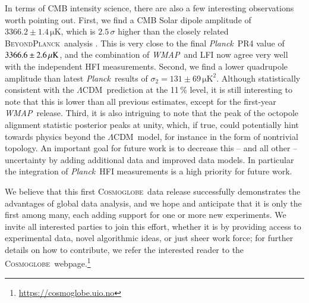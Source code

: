 \documentclass[twocolumn]{../../common/aa}
\def\WMAP{\emph{WMAP}}
\def\COBE{\emph{COBE}}
\def\Planck{\emph{Planck}}
\def\LCDM{$\Lambda$CDM}
\newcommand{\bp}{\textsc{BeyondPlanck}}
\newcommand{\cosmoglobe}{\textsc{Cosmoglobe}}
\begin{document}
In terms of CMB intensity science, there are also a few interesting observations worth pointing out. First, we find a CMB Solar dipole amplitude of $3366.2\pm1.4\,\mathrm{\mu K}$, which is $2.5\,\sigma$ higher than the closely related \bp\ analysis \citep{bp11}. This is very close to the final \Planck\ PR4 value of $3366.6\pm2.6\muK$, and the combination of \WMAP\ and LFI now agree very well with the independent HFI measurements. Second, we find a lower quadrupole amplitude than latest \Planck\ results of $\sigma_2 = 131 \pm 69\,\mathrm{\mu K^2}$. Although statistically consistent with the \LCDM\ prediction at the 11\,\% level, it is still interesting to note that this is lower than all previous estimates, except for the first-year \WMAP\ release. Third, it is also intriguing to note that the peak of the octopole alignment statistic posterior peaks at unity, which, if true, could potentially hint towards physics beyond the \LCDM\ model, for instance in the form of nontrivial topology. An important goal for future work is to decrease this -- and all other -- uncertainty by adding additional data and improved data models. In particular the integration of \Planck\ HFI measurements is a high priority for future work.

We believe that this first \cosmoglobe\ data release successfully demonstrates the advantages of global data analysis, and we hope and anticipate that it is only the first among many, each adding support for one or more new experiments. We invite all interested parties to join this effort, whether it is by providing access to experimental data, novel algorithmic ideas, or just sheer work force; for further details on how to contribute, we refer the interested reader to the \cosmoglobe\ webpage.\footnote{\url{https://cosmoglobe.uio.no}}



\end{document}
